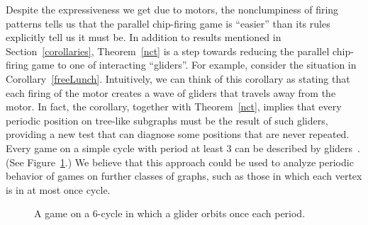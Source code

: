 Despite the expressiveness we get due to motors, the nonclumpiness of firing
patterns tells us that the parallel chip-firing game is ``easier'' than its
rules explicitly tell us it must be. In addition to results mentioned in
Section~\ref{corollaries}, Theorem~\ref{nct} is a step towards reducing the
parallel chip-firing game to one of interacting ``gliders''. For example,
consider the situation in Corollary~\ref{freeLunch}. Intuitively, we can think
of this corollary as stating that each firing of the motor creates a wave of
gliders that travels away from the motor. In fact, the corollary, together with
Theorem~\ref{nct}, implies that every periodic position on tree-like subgraphs
must be the result of such gliders, providing a new test that can diagnose some
positions that are never repeated. Every game on a simple cycle with period at
least 3 can be described by gliders~\cite{cycle}. (See Figure~\ref{cycleFig}.)
We believe that this approach could be used to analyze periodic behavior of
games on further classes of graphs, such as those in which each vertex is in at
most once cycle.

\begin{centering}
\begin{figure}[tbh]
  \caption{A game on a 6-cycle in which a glider orbits once each period.}
  \label{cycleFig}
\end{figure}
\end{centering}

